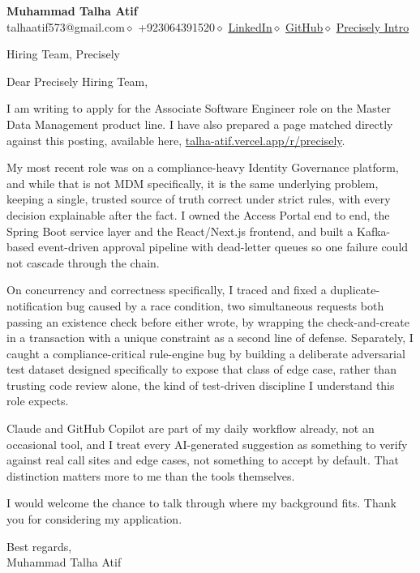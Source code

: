 \documentclass[10pt, letterpaper]{article}
\begin{document}
\pagestyle{empty}

{\Large\bfseries\color{navy} Muhammad Talha Atif}\\[2pt]
{\small\color{lightgray}
  talhaatif573@gmail.com\enspace$\diamond$\enspace
  +923064391520\enspace$\diamond$\enspace
  \href{https://linkedin.com/in/muhammad-talha-atif}{LinkedIn}\enspace$\diamond$\enspace
  \href{https://github.com/M-Talha-Atif}{GitHub}\enspace$\diamond$\enspace
  \href{https://talha-atif.vercel.app/r/precisely}{Precisely Intro}}

\vspace{14pt}

{\small\color{medgray} Hiring Team, Precisely}

\vspace{14pt}

Dear Precisely Hiring Team,

I am writing to apply for the Associate Software Engineer role on the Master Data Management
product line. I have also prepared a page matched directly against this posting, available
here, \href{https://talha-atif.vercel.app/r/precisely}{talha-atif.vercel.app/r/precisely}.

My most recent role was on a compliance-heavy Identity Governance platform, and while that is
not MDM specifically, it is the same underlying problem, keeping a single, trusted source of
truth correct under strict rules, with every decision explainable after the fact. I owned the
Access Portal end to end, the Spring Boot service layer and the React/Next.js frontend, and
built a Kafka-based event-driven approval pipeline with dead-letter queues so one failure
could not cascade through the chain.

On concurrency and correctness specifically, I traced and fixed a duplicate-notification bug
caused by a race condition, two simultaneous requests both passing an existence check before
either wrote, by wrapping the check-and-create in a transaction with a unique constraint as a
second line of defense. Separately, I caught a compliance-critical rule-engine bug by building
a deliberate adversarial test dataset designed specifically to expose that class of edge case,
rather than trusting code review alone, the kind of test-driven discipline I understand this
role expects.

Claude and GitHub Copilot are part of my daily workflow already, not an occasional tool, and I
treat every AI-generated suggestion as something to verify against real call sites and edge
cases, not something to accept by default. That distinction matters more to me than the tools
themselves.

I would welcome the chance to talk through where my background fits. Thank you for considering
my application.

\vspace{10pt}

Best regards,\\
Muhammad Talha Atif
\end{document}
